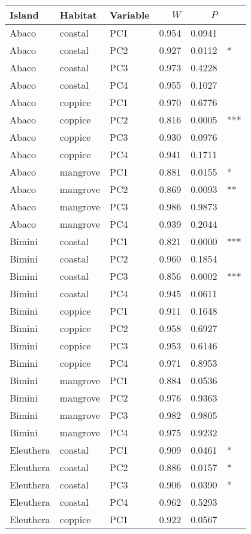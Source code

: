 
\begin{tabular}{lllrrl}
\toprule
Island & Habitat & Variable & $W$ & $P$ & \\
\midrule
Abaco & coastal & PC1 & 0.954 & 0.0941 & \\
Abaco & coastal & PC2 & 0.927 & 0.0112 & *\\
Abaco & coastal & PC3 & 0.973 & 0.4228 & \\
Abaco & coastal & PC4 & 0.955 & 0.1027 & \\
Abaco & coppice & PC1 & 0.970 & 0.6776 & \\
Abaco & coppice & PC2 & 0.816 & 0.0005 & ***\\
Abaco & coppice & PC3 & 0.930 & 0.0976 & \\
Abaco & coppice & PC4 & 0.941 & 0.1711 & \\
Abaco & mangrove & PC1 & 0.881 & 0.0155 & *\\
Abaco & mangrove & PC2 & 0.869 & 0.0093 & **\\
Abaco & mangrove & PC3 & 0.986 & 0.9873 & \\
Abaco & mangrove & PC4 & 0.939 & 0.2044 & \\
Bimini & coastal & PC1 & 0.821 & 0.0000 & ***\\
Bimini & coastal & PC2 & 0.960 & 0.1854 & \\
Bimini & coastal & PC3 & 0.856 & 0.0002 & ***\\
Bimini & coastal & PC4 & 0.945 & 0.0611 & \\
Bimini & coppice & PC1 & 0.911 & 0.1648 & \\
Bimini & coppice & PC2 & 0.958 & 0.6927 & \\
Bimini & coppice & PC3 & 0.953 & 0.6146 & \\
Bimini & coppice & PC4 & 0.971 & 0.8953 & \\
Bimini & mangrove & PC1 & 0.884 & 0.0536 & \\
Bimini & mangrove & PC2 & 0.976 & 0.9363 & \\
Bimini & mangrove & PC3 & 0.982 & 0.9805 & \\
Bimini & mangrove & PC4 & 0.975 & 0.9232 & \\
Eleuthera & coastal & PC1 & 0.909 & 0.0461 & *\\
Eleuthera & coastal & PC2 & 0.886 & 0.0157 & *\\
Eleuthera & coastal & PC3 & 0.906 & 0.0390 & *\\
Eleuthera & coastal & PC4 & 0.962 & 0.5293 & \\
Eleuthera & coppice & PC1 & 0.922 & 0.0567 & \\

\end{tabular}
